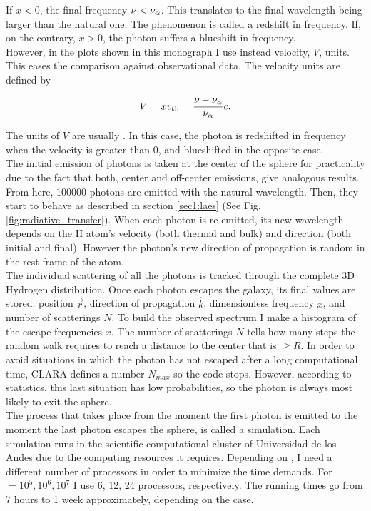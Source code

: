 \documentclass[twocolappendix]{latex/emulateapj}
\begin{document}
If $x < 0$, the final frequency $\nu < \nu_{\rm \alpha}$. This translates to the final wavelength being larger than the \lya natural one. The phenomenon is called a redshift in frequency. If, on the contrary, $x > 0$, the photon suffers a blueshift in frequency. \\

However, in the plots shown in this monograph I use instead velocity, $V$, units. This eases the comparison against observational data. The velocity units are defined by

\begin{equation}
	\label{eq:V}
	V = xv_{\rm th} = \frac{\nu -\nu_{\rm \alpha}}{\nu_{\rm \alpha}}c.
\end{equation}

The units of $V$ are usually \kms. In this case, the photon is redshifted in frequency when the velocity is greater than 0, and blueshifted in the opposite case. \\

The initial emission of photons is taken at the center of the sphere for practicality due to the fact that both, center and off-center emissions, give analogous results. From here, $100000$ photons are emitted with the natural \lya wavelength. Then, they start to behave as described in section \ref{sec1:laes} (See Fig. \ref{fig:radiative_transfer}). When each photon is re-emitted, its new wavelength depends on the H atom's velocity (both thermal and bulk) and direction (both initial and final). However the photon's new direction of propagation is random in the rest frame of the atom. \\ 

The individual scattering of all the photons is tracked through the complete 3D Hydrogen distribution. Once each photon escapes the galaxy, its final values are stored: position $\vec{r}$, direction of propagation $\hat{k}$, dimensionless frequency $x$, and number of scatterings $N$. To build the observed spectrum I make a histogram of the escape frequencies $x$. The number of scatterings $N$ tells how many steps the random walk requires to reach a distance to the center that is $\geq R$. In order to avoid situations in which the photon has not escaped after a long computational time, CLARA defines a number $N_{max}$ so the code stops. However, according to statistics, this last situation has low probabilities, so the photon is always most likely to exit the sphere. \\

The process that takes place from the moment the first photon is emitted to the moment the last photon escapes the sphere, is called a simulation. Each simulation runs in the scientific computational cluster of Universidad de los Andes due to the computing resources it requires. Depending on \tauh, I need a different number of processors in order to minimize the time demands. For \tauh $=10^5, 10^6, 10^7$ I use 6, 12, 24 processors, respectively. The running times go from 7 hours to 1 week approximately, depending on the case. \\
\end{document}
